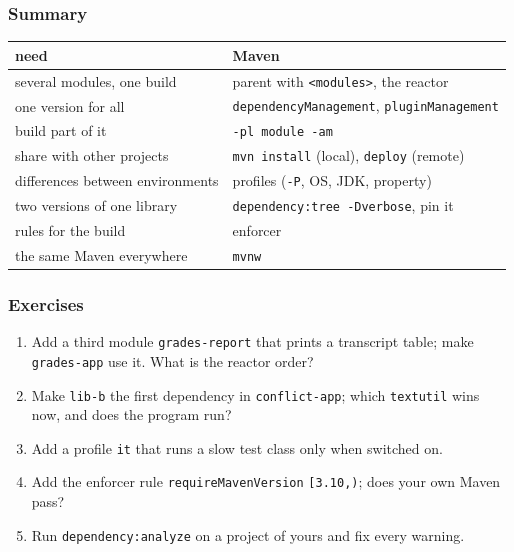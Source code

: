 \documentclass[aspectratio=169,10pt,compress]{beamer}
\begin{document}
\begin{frame}[t,fragile] \frametitle{Summary}
  \begin{center}\small
  \begin{tabular}{@{}L{0.4\textwidth}L{0.52\textwidth}@{}}
    \toprule
    \textbf{need}                         & \textbf{Maven} \\
    \midrule
    several modules, one build            & parent with \texttt{<modules>}, the reactor \\
    one version for all                   & \texttt{dependencyManagement}, \texttt{pluginManagement} \\
    build part of it                      & \texttt{-pl module -am} \\
    share with other projects             & \texttt{mvn install} (local), \texttt{deploy} (remote) \\
    differences between environments      & profiles (\texttt{-P}, OS, JDK, property) \\
    two versions of one library           & \texttt{dependency:tree -Dverbose}, pin it \\
    rules for the build                   & enforcer \\
    the same Maven everywhere             & \texttt{mvnw} \\
    \bottomrule
  \end{tabular}
  \end{center}
\end{frame}




\begin{frame}[t,fragile] \frametitle{Exercises}
  \begin{enumerate}\small
    \item Add a third module \texttt{grades-report} that prints a transcript table; make \texttt{grades-app} use it. What is the reactor order?
    \item Make \texttt{lib-b} the first dependency in \texttt{conflict-app}; which \texttt{textutil} wins now, and does the program run?
    \item Add a profile \texttt{it} that runs a slow test class only when switched on.
    \item Add the enforcer rule \texttt{requireMavenVersion} \texttt{[3.10,)}; does your own Maven pass?
    \item Run \texttt{dependency:analyze} on a project of yours and fix every warning.
  \end{enumerate}
\end{frame}




\begin{frame}[t,fragile]
	\begin{center}
		\vspace{4cm}
	\end{center}
\end{frame}
\end{document}
